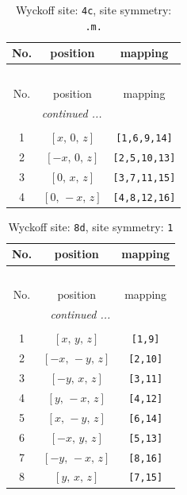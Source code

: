 \documentclass[fleqn,8pt]{jsarticle}
\begin{document}
\renewcommand{\arraystretch}{1.2}
\begin{longtable}{ccc}
\caption{Wyckoff site: {\tt 4c}, site symmetry: {\tt .m.}}
 \\
 \hline \hline
No. & position & mapping \\ \hline \endfirsthead

\multicolumn{2}{l}{\tablename\ \thetable{}} \\
 \hline \hline
No. & position & mapping \\ \hline \endhead

 \hline \hline
\multicolumn{2}{r}{\footnotesize\it continued ...} \\ \endfoot

 \hline \hline
\multicolumn{2}{r}{} \\ \endlastfoot

1 & $\left[ x,\, 0,\, z \right]$ & {\tt [1,6,9,14]} \\ \hline
2 & $\left[ - x,\, 0,\, z \right]$ & {\tt [2,5,10,13]} \\ \hline
3 & $\left[ 0,\, x,\, z \right]$ & {\tt [3,7,11,15]} \\ \hline
4 & $\left[ 0,\, - x,\, z \right]$ & {\tt [4,8,12,16]} \\
\end{longtable}
\renewcommand{\arraystretch}{1.2}
\begin{longtable}{ccc}
\caption{Wyckoff site: {\tt 8d}, site symmetry: {\tt 1}}
 \\
 \hline \hline
No. & position & mapping \\ \hline \endfirsthead

\multicolumn{2}{l}{\tablename\ \thetable{}} \\
 \hline \hline
No. & position & mapping \\ \hline \endhead

 \hline \hline
\multicolumn{2}{r}{\footnotesize\it continued ...} \\ \endfoot

 \hline \hline
\multicolumn{2}{r}{} \\ \endlastfoot

1 & $\left[ x,\, y,\, z \right]$ & {\tt [1,9]} \\ \hline
2 & $\left[ - x,\, - y,\, z \right]$ & {\tt [2,10]} \\ \hline
3 & $\left[ - y,\, x,\, z \right]$ & {\tt [3,11]} \\ \hline
4 & $\left[ y,\, - x,\, z \right]$ & {\tt [4,12]} \\ \hline
5 & $\left[ x,\, - y,\, z \right]$ & {\tt [6,14]} \\ \hline
6 & $\left[ - x,\, y,\, z \right]$ & {\tt [5,13]} \\ \hline
7 & $\left[ - y,\, - x,\, z \right]$ & {\tt [8,16]} \\ \hline
8 & $\left[ y,\, x,\, z \right]$ & {\tt [7,15]} \\
\end{longtable}
\end{document}
